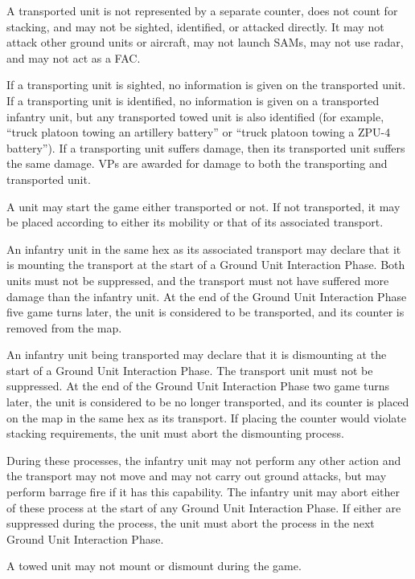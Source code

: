 A transported unit is not represented by a separate counter, does not count for stacking, and may not be sighted, identified, or attacked directly. It may not attack other ground units or aircraft, may not launch SAMs, may not use radar, and may not act as a FAC.

If a transporting unit is sighted, no information is given on the transported unit. If a transporting unit is identified, no information is given on a transported infantry unit, but any transported towed unit is also identified (for example, “truck platoon towing an artillery battery” or “truck platoon towing a ZPU-4 battery”). If a transporting unit suffers damage, then its transported unit suffers the same damage.
VPs are awarded for damage to both the transporting and transported unit.

A unit may start the game either transported or not. If not transported, it may be placed according to either its mobility or that of its associated transport.%

An infantry unit in the same hex as its associated transport may declare that it is mounting the transport at the start of a Ground Unit Interaction Phase.
Both units must not be suppressed, and the transport must not have suffered more damage than the infantry unit.
At the end of the Ground Unit Interaction Phase five game turns later, the unit is considered to be transported, and its counter is removed from the map.

An infantry unit being transported may declare that it is dismounting at the start of a Ground Unit Interaction Phase.
The transport unit must not be suppressed.
At the end of the Ground Unit Interaction Phase two game turns later, the unit is considered to be no longer transported, and its counter is placed on the map in the same hex as its transport.
If placing the counter would violate stacking requirements, the unit must abort the dismounting process.

During these processes, the infantry unit may not perform any other action and the transport may not move and may not carry out ground attacks, but may perform barrage fire if it has this capability.
The infantry unit may abort either of these process at the start of any Ground Unit Interaction Phase.
If either are suppressed during the process, the unit must abort the process in the next Ground Unit Interaction Phase.%

A towed unit may not mount or dismount during the game.
